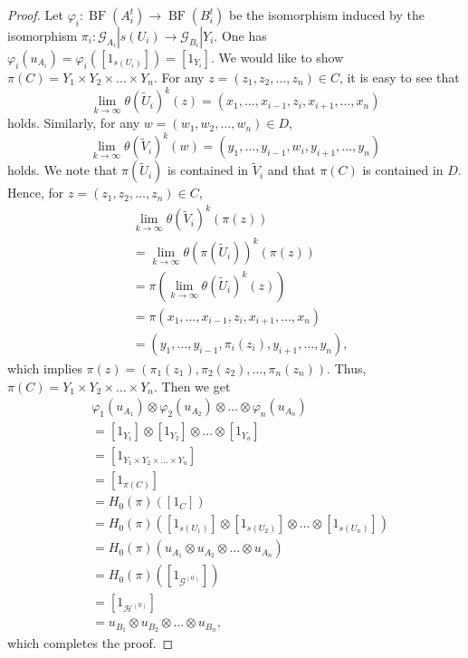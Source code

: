 \documentclass[11pt]{article}
\theoremstyle{definition}
\numberwithin{equation}{section}
\renewcommand{\phi}{\varphi}
\newcommand{\BF}{\operatorname{BF}}
\newcommand{\G}{\mathcal{G}}
\renewcommand{\H}{\mathcal{H}}
\begin{document}
\begin{proof}
Let $\phi_i:\BF(A_i^t)\to\BF(B_i^t)$ be the isomorphism 
induced by the isomorphism $\pi_i:\G_{A_i}|s(U_i)\to\G_{B_i}|Y_i$. 
One has $\phi_i(u_{A_i})=\phi_i([1_{s(U_i)}])=[1_{Y_i}]$. 
We would like to show $\pi(C)=Y_1\times Y_2\times\dots\times Y_n$. 
For any $z=(z_1,z_2,\dots,z_n)\in C$, it is easy to see that 
\[
\lim_{k\to\infty}\theta(\widetilde U_i)^k(z)
=(x_1,\dots,x_{i-1},z_i,x_{i+1},\dots,x_n)
\]
holds. 
Similarly, for any $w=(w_1,w_2,\dots,w_n)\in D$, 
\[
\lim_{k\to\infty}\theta(\widetilde V_i)^k(w)
=(y_1,\dots,y_{i-1},w_i,y_{i+1},\dots,y_n)
\]
holds. 
We note that $\pi(\widetilde U_i)$ is contained in $\widetilde V_i$ and 
that $\pi(C)$ is contained in $D$. 
Hence, for $z=(z_1,z_2,\dots,z_n)\in C$, 
\begin{align*}
&\lim_{k\to\infty}\theta(\widetilde V_i)^k(\pi(z))\\
&=\lim_{k\to\infty}
\theta(\pi(\widetilde U_i))^k(\pi(z))\\
&=\pi\left(\lim_{k\to\infty}\theta(\widetilde U_i)^k(z)\right)\\
&=\pi(x_1,\dots,x_{i-1},z_i,x_{i+1},\dots,x_n)\\
&=(y_1,\dots,y_{i-1},\pi_i(z_i),y_{i+1},\dots,y_n), 
\end{align*}
which implies $\pi(z)=(\pi_1(z_1),\pi_2(z_2),\dots,\pi_n(z_n))$. 
Thus, $\pi(C)=Y_1\times Y_2\times\dots\times Y_n$. 
Then we get 
\begin{align*}
&\phi_1(u_{A_1})\otimes\phi_2(u_{A_2})\otimes\dots\otimes\phi_n(u_{A_n})\\
&=[1_{Y_1}]\otimes[1_{Y_2}]\otimes\dots\otimes[1_{Y_n}]\\
&=[1_{Y_1\times Y_2\times\dots\times Y_n}]\\
&=[1_{\pi(C)}]\\
&=H_0(\pi)([1_C])\\
&=H_0(\pi)([1_{s(U_1)}]\otimes[1_{s(U_2)}]\otimes\dots\otimes[1_{s(U_n)}])\\
&=H_0(\pi)(u_{A_1}\otimes u_{A_2}\otimes\dots\otimes u_{A_n})\\
&=H_0(\pi)([1_{\G^{(0)}}])\\
&=[1_{\H^{(0)}}]\\
&=u_{B_1}\otimes u_{B_2}\otimes\dots\otimes u_{B_n}, 
\end{align*}
which completes the proof. 
\end{proof}
\end{document}
